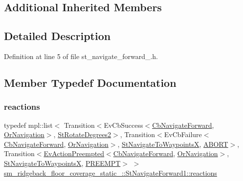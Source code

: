 \subsection*{Additional Inherited Members}


\subsection{Detailed Description}


Definition at line 5 of file st\+\_\+navigate\+\_\+forward\+\_.\+h.



\subsection{Member Typedef Documentation}
\mbox{\label{structsm__ridgeback__floor__coverage__static__1_1_1StNavigateForward1_a6fc75d9b301c3f342815132aa4baba4e}} 
\subsubsection{\texorpdfstring{reactions}{reactions}}
{\footnotesize\ttfamily typedef mpl\+::list$<$ Transition$<$Ev\+Cb\+Success$<$\hyperlink{classcl__move__base__z_1_1CbNavigateForward}{Cb\+Navigate\+Forward}, \hyperlink{classsm__ridgeback__floor__coverage__static__1_1_1OrNavigation}{Or\+Navigation}$>$, \hyperlink{structsm__ridgeback__floor__coverage__static__1_1_1StRotateDegrees2}{St\+Rotate\+Degrees2}$>$, Transition$<$Ev\+Cb\+Failure$<$\hyperlink{classcl__move__base__z_1_1CbNavigateForward}{Cb\+Navigate\+Forward}, \hyperlink{classsm__ridgeback__floor__coverage__static__1_1_1OrNavigation}{Or\+Navigation}$>$, \hyperlink{structsm__ridgeback__floor__coverage__static__1_1_1StNavigateToWaypointsX}{St\+Navigate\+To\+WaypointsX}, \hyperlink{structsmacc_1_1default__transition__tags_1_1ABORT}{A\+B\+O\+RT}$>$, Transition$<$\hyperlink{structsmacc_1_1default__events_1_1EvActionPreempted}{Ev\+Action\+Preempted}$<$\hyperlink{classcl__move__base__z_1_1CbNavigateForward}{Cb\+Navigate\+Forward}, \hyperlink{classsm__ridgeback__floor__coverage__static__1_1_1OrNavigation}{Or\+Navigation}$>$, \hyperlink{structsm__ridgeback__floor__coverage__static__1_1_1StNavigateToWaypointsX}{St\+Navigate\+To\+WaypointsX}, \hyperlink{structsmacc_1_1default__transition__tags_1_1PREEMPT}{P\+R\+E\+E\+M\+PT}$>$ $>$ \hyperlink{structsm__ridgeback__floor__coverage__static__1_1_1StNavigateForward1_a6fc75d9b301c3f342815132aa4baba4e}{sm\+\_\+ridgeback\+\_\+floor\+\_\+coverage\+\_\+static\+\_\+::\+St\+Navigate\+Forward1\+::reactions}}



